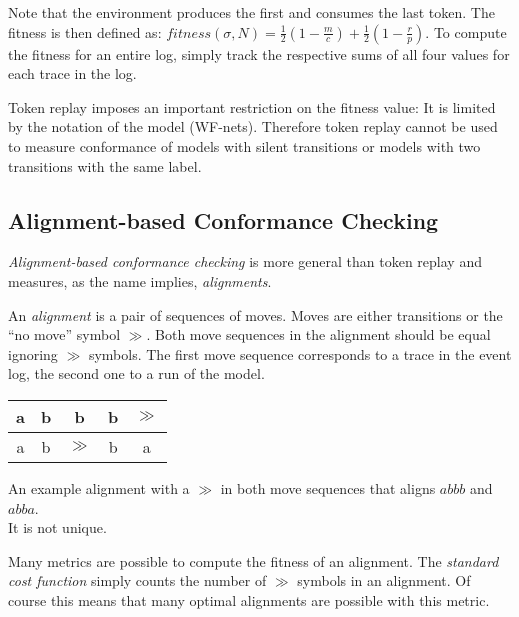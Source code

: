 \documentclass[english]{panikzettel}
\begin{document}
Note that the environment produces the first and consumes the last token.
The fitness is then defined as:
$fitness(\sigma, N) = \frac{1}{2} \left( 1 - \frac{m}{c} \right) + \frac{1}{2} \left( 1 - \frac{r}{p} \right)$.
To compute the fitness for an entire log, simply track the respective sums of all four values for each trace in the log.

Token replay imposes an important restriction on the fitness value: It is limited by the notation of the model (WF-nets).
Therefore token replay cannot be used to measure conformance of models with silent transitions or models with two transitions with the same label.

\vspace{-0.5\baselineskip}
\subsection{Alignment-based Conformance Checking}

\emph{Alignment-based conformance checking} is more general than token replay and measures, as the name implies, \emph{alignments}.

\begin{halfboxl}
An \emph{alignment} is a pair of sequences of moves.
Moves are either transitions or the ``no move'' symbol $\gg$.
Both move sequences in the alignment should be equal ignoring $\gg$ symbols.
The first move sequence corresponds to a trace in the event log, the second one to a run of the model.
\end{halfboxl}%
\begin{halfboxr}
\vspace{-\baselineskip}
\begin{center}
\begin{tabular}{c|c|c|c|c}
a & b & b & b & $\gg$ \\ \hline
a & b & $\gg$  & b & a
\end{tabular}

An example alignment with a $\gg$ in both move sequences that aligns $abbb$ and $abba$. \\
It is not unique.
\end{center}
\end{halfboxr}

Many metrics are possible to compute the fitness of an alignment.
The \emph{standard cost function} simply counts the number of $\gg$ symbols in an alignment.
Of course this means that many optimal alignments are possible with this metric.
\end{document}

